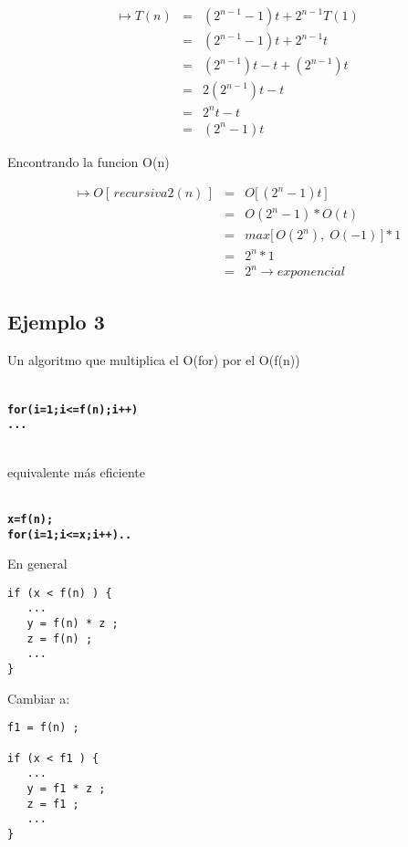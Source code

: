   \begin{eqnarray*}
    \mapsto T(n) &=& (2^{n-1}-1)t + 2^{n-1} T(1)\\
    &=& (2^{n-1}-1)t + 2^{n-1}t\\
    &=& (2^{n-1})t-t+(2^{n-1})t\\
    &=& 2(2^{n-1})t-t\\
    &=& 2^n t-t\\
    &=&(2^n - 1)t
  \end{eqnarray*}

  Encontrando la funcion O(n)

  \begin{eqnarray*}
    \mapsto O[\, recursiva2(n) \,] &=& O \bigl[\,( 2^n - 1 )t \, \bigr]\\
    &=& O(2^n-1)*O(t) \\ 
    &=& max \bigl[\, O(2^n),\; O(-1) \,\bigr]*1\\
    &=& 2^n*1\\
    &=& 2^n  \rightarrow exponencial
  \end{eqnarray*}

  \subsection{Ejemplo 3}
  \label{sec:ejemplo-3}

  Un algoritmo que multiplica el O(for) por el O(f(n))

\begin{alltt}
    {\bf
    for (i=1; i <= f(n) ; i ++ ){
     ...
    }
  }
\end{alltt}
equivalente más eficiente
\begin{alltt}
  {\bf
    x = f(n) ;
    for (i=1; i <= x ; i ++ ){..}
  }
\end{alltt}

En general

\begin{verbatim}
if (x < f(n) ) {
   ...
   y = f(n) * z ;
   z = f(n) ;
   ...
}
\end{verbatim}

Cambiar a:

\begin{verbatim}
f1 = f(n) ;

if (x < f1 ) {
   ...
   y = f1 * z ;
   z = f1 ;
   ...
}
\end{verbatim}

